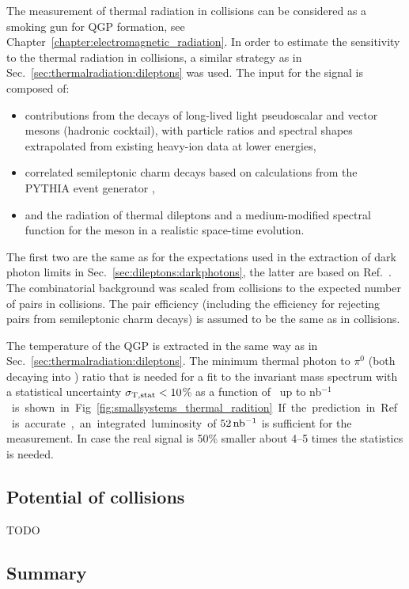 \documentclass[../report.tex]{subfiles}
\begin{document}
The measurement of thermal radiation in \pPb collisions can be considered as a smoking gun for QGP formation, see Chapter~\ref{chapter:electromagnetic_radiation}. In order to estimate the sensitivity to the thermal radiation in \pPb collisions, a similar strategy as in Sec.~\ref{sec:thermalradiation:dileptons} was used.
The input for the signal is composed of: 
\begin{itemize}
\item contributions from the decays of long-lived light pseudoscalar and vector mesons (hadronic cocktail), with particle ratios and spectral shapes extrapolated from existing heavy-ion data at lower energies,
\item correlated semileptonic charm decays based on calculations from the PYTHIA event generator \cite{Sjostrand:2006za},
\item and the radiation of thermal dileptons and a medium-modified spectral function for the \Prho meson in a realistic space-time evolution.
\end{itemize}
The first two are the same as for the expectations used in the extraction of dark photon limits in Sec.~\ref{sec:dileptons:darkphotons}, the latter are based on Ref.~\cite{}. The combinatorial background was scaled from \PbPb collisions to the expected number of pairs in \pPb collisions. The pair efficiency (including the efficiency for rejecting \Pepem pairs from semileptonic charm decays) is assumed to be the same as in \PbPb collisions.

The temperature of the QGP is extracted in the same way as in Sec.~\ref{sec:thermalradiation:dileptons}. The minimum thermal photon to $\pi^{0}$ (both decaying into \Pepem) ratio that is needed for a fit to the invariant mass spectrum with a statistical uncertainty $\sigma_{\rm T,stat} < 10$\% as a function of \Lint\ up to \unit[2000]{nb$^{-1}$} is shown in Fig.~\ref{fig:smallsystems_thermal_radition}. If the prediction in Ref.~\cite{RappPriv1} is accurate, an integrated luminosity of $\unit[52]{nb^{-1}}$ is sufficient for the measurement. In case the real signal is 50\% smaller about 4--5 times the statistics is needed.

\subsection{Potential of \OO collisions}

TODO

\subsection{Summary}
\end{document}
